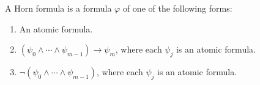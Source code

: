 A Horn formula is a formula $\varphi$ of one of the following forms:
\begin{enumerate}
\item[(i)] An atomic formula.
\item[(ii)] $(\psi_0 \wedge \cdots \wedge \psi_{m-1}) \rightarrow \psi_m$, where each $\psi_j$ is an atomic formula.
\item[(iii)] $\neg(\psi_0 \wedge \cdots \wedge \psi_{m-1})$, where each $\psi_j$ is an atomic formula.
\end{enumerate}
